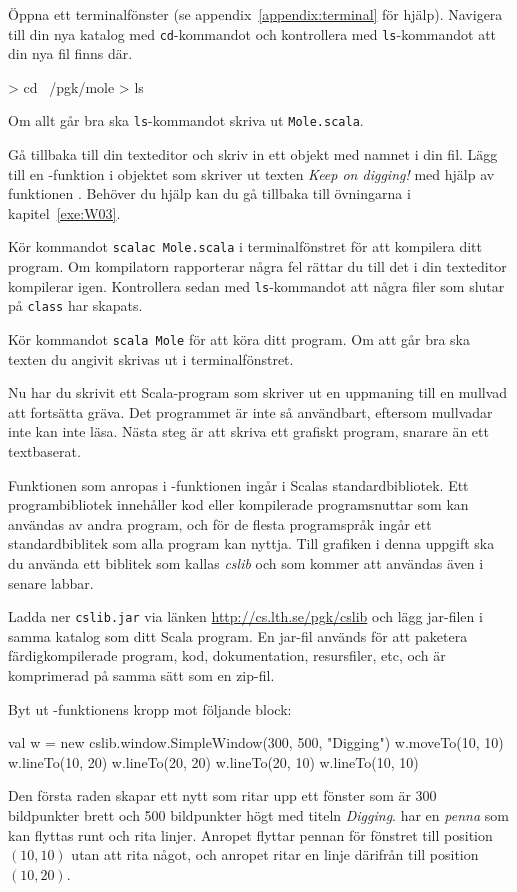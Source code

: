 \Subtask
Öppna ett terminalfönster (se appendix~\ref{appendix:terminal} för hjälp).
Navigera till din nya katalog med \texttt{cd}-kommandot  och kontrollera med \texttt{ls}-kommandot  att din nya fil finns där.
\begin{REPLnonum}
> cd ~/pgk/mole
> ls
\end{REPLnonum}
Om allt går bra ska \texttt{ls}-kommandot skriva ut \texttt{Mole.scala}.

\Subtask
Gå tillbaka till din texteditor och skriv in ett objekt med namnet  i din fil.
Lägg till en -funktion i objektet som skriver ut texten \emph{Keep on digging!} med hjälp av funktionen .
Behöver du hjälp kan du gå tillbaka till övningarna i kapitel~\ref{exe:W03}.

\Subtask
Kör kommandot \texttt{scalac Mole.scala} i terminalfönstret för att kompilera ditt program.
Om kompilatorn rapporterar några fel rättar du till det i din texteditor kompilerar igen.
Kontrollera sedan med \texttt{ls}-kommandot att några filer som slutar på \texttt{class} har skapats.

\Subtask
Kör kommandot \texttt{scala Mole} för att köra ditt program.
Om att går bra ska texten du angivit skrivas ut i terminalfönstret.


\Task
Nu har du skrivit ett Scala-program som skriver ut en uppmaning till en mullvad att fortsätta gräva.
Det programmet är inte så användbart, eftersom mullvadar inte kan inte läsa.
Nästa steg är att skriva ett grafiskt program, snarare än ett textbaserat.

Funktionen  som anropas i -funktionen ingår i Scalas standardbibliotek.
Ett programbibliotek innehåller kod eller kompilerade programsnuttar som kan användas av andra program, och för de flesta programspråk ingår ett standardbiblitek som alla program kan nyttja.
Till grafiken i denna uppgift ska du använda ett biblitek som kallas \emph{cslib} och som kommer att användas även i senare labbar.

\Subtask

Ladda ner \texttt{cslib.jar} via länken \url{http://cs.lth.se/pgk/cslib} och lägg jar-filen i samma katalog som ditt Scala program.
En jar-fil används för att paketera färdigkompilerade program, kod, dokumentation, resursfiler, etc, och är komprimerad på samma sätt som en zip-fil.

\Subtask
Byt ut -funktionens kropp mot följande block:
\begin{Code}
{
	val w = new cslib.window.SimpleWindow(300, 500, "Digging")
	w.moveTo(10, 10)
	w.lineTo(10, 20)
	w.lineTo(20, 20)
	w.lineTo(20, 10)
	w.lineTo(10, 10)
}
\end{Code}
Den första raden skapar ett nytt  som ritar upp ett fönster som är 300 bildpunkter brett och 500 bildpunkter högt med titeln \emph{Digging}.
 har en \emph{penna} som kan flyttas runt och rita linjer.
Anropet  flyttar pennan för fönstret  till position $(10,10)$ utan att rita något, och anropet  ritar en linje därifrån till position $(10, 20)$.

